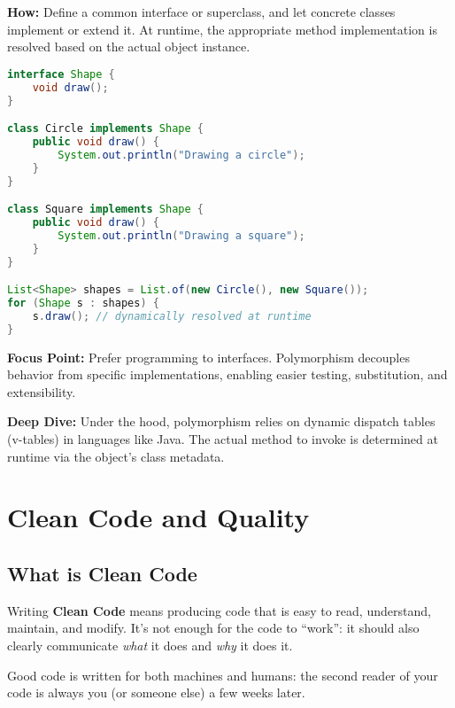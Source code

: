 \documentclass[a4paper,12pt]{article}
\begin{document}
\textbf{How:} Define a common interface or superclass, and let concrete classes implement or extend it. At runtime, the appropriate method implementation is resolved based on the actual object instance.

\begin{lstlisting}[language=Java]
interface Shape {
    void draw();
}

class Circle implements Shape {
    public void draw() {
        System.out.println("Drawing a circle");
    }
}

class Square implements Shape {
    public void draw() {
        System.out.println("Drawing a square");
    }
}

List<Shape> shapes = List.of(new Circle(), new Square());
for (Shape s : shapes) {
    s.draw(); // dynamically resolved at runtime
}
\end{lstlisting}

\textbf{Focus Point:} Prefer programming to interfaces. Polymorphism decouples behavior from specific implementations, enabling easier testing, substitution, and extensibility.

\textbf{Deep Dive:} Under the hood, polymorphism relies on dynamic dispatch tables (v-tables) in languages like Java. The actual method to invoke is determined at runtime via the object's class metadata.





\section{Clean Code and Quality}

\subsection{What is Clean Code}
Writing \textbf{Clean Code} means producing code that is easy to read, understand, maintain, and modify. It’s not enough for the code to “work”: it should also clearly communicate \emph{what} it does and \emph{why} it does it.

Good code is written for both machines and humans: the second reader of your code is always you (or someone else) a few weeks later.
\end{document}
